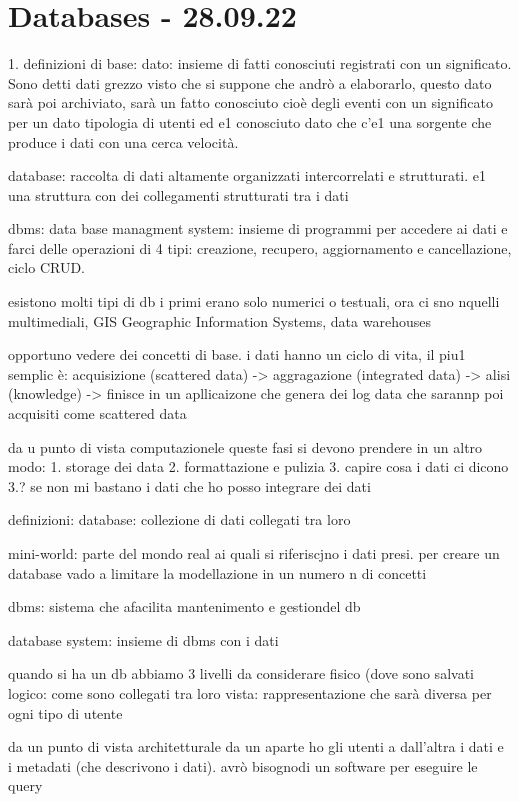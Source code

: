 
\section{Databases - 28.09.22}

1. definizioni di base:
dato: insieme di fatti conosciuti registrati con un significato. Sono detti dati grezzo visto che si suppone che andrò a elaborarlo, questo dato sarà poi archiviato, sarà un fatto conosciuto cioè degli eventi con un significato per un dato tipologia di utenti ed e1 conosciuto dato che c'e1 una sorgente che produce i dati con una cerca velocità.

database: raccolta di dati altamente organizzati intercorrelati e strutturati. e1 una struttura con dei collegamenti strutturati tra i dati

dbms: data base managment system: insieme di programmi per accedere ai dati e farci delle operazioni di 4 tipi: creazione, recupero, aggiornamento e cancellazione, ciclo CRUD.

esistono molti tipi di db i primi erano solo numerici o testuali, ora ci sno nquelli multimediali, GIS Geographic Information Systems, data warehouses

opportuno vedere dei concetti di base. i dati hanno un ciclo di vita, il piu1 semplic è:
acquisizione (scattered data) -> aggragazione (integrated data) -> alisi (knowledge) -> finisce in un apllicaizone che genera dei log data che sarannp poi acquisiti come scattered data

da u punto di vista computazionele queste fasi si devono prendere in un altro modo:
1. storage dei data
2. formattazione e pulizia
3. capire cosa i dati ci dicono 
3.? se non mi bastano i dati che ho posso integrare dei dati 

definizioni:
database: collezione di dati collegati tra loro

mini-world: parte del mondo real ai quali si riferiscjno i dati presi. per creare un database vado a limitare la modellazione in un numero n di concetti

dbms: sistema che afacilita mantenimento e gestiondel db

database system: insieme di dbms con i dati


quando si ha un db abbiamo 3 livelli da considerare
fisico (dove sono salvati
logico: come sono collegati tra loro
vista: rappresentazione che sarà diversa per ogni tipo di utente


da un punto di vista architetturale da un aparte ho gli utenti a dall'altra i dati e i metadati (che descrivono i dati). avrò bisognodi un software per eseguire le query 

